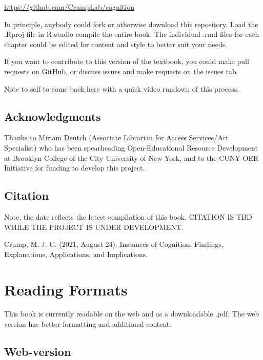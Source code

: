 \documentclass[
  oneside,
  12pt]{crumpbook}
\begin{document}
\url{https://github.com/CrumpLab/cognition}

In principle, anybody could fork or otherwise download this repository. Load the .Rproj file in R-studio compile the entire book. The individual .rmd files for each chapter could be edited for content and style to better suit your needs.

If you want to contribute to this version of the textbook, you could make pull requests on GitHub, or discuss issues and make requests on the issues tab.

Note to self to come back here with a quick video rundown of this process.

\hypertarget{acknowledgments}{%
\section{Acknowledgments}\label{acknowledgments}}

Thanks to Miriam Deutch (Associate Librarian for Access Services/Art Specialist) who has been spearheading Open-Educational Resource Development at Brooklyn College of the City University of New York, and to the CUNY OER Initiative for funding to develop this project.

\hypertarget{citation}{%
\section{Citation}\label{citation}}

Note, the date reflects the latest compilation of this book. CITATION IS TBD WHILE THE PROJECT IS UNDER DEVELOPMENT.

Crump, M. J. C. (2021, August 24). Instances of Cognition: Findings, Explanations, Applications, and Implications.

\hypertarget{reading-formats}{%
\chapter*{Reading Formats}\label{reading-formats}}

This book is currently readable on the web and as a downloadable .pdf. The web version has better formatting and additional content.

\hypertarget{web-version}{%
\section{Web-version}\label{web-version}}
\end{document}
